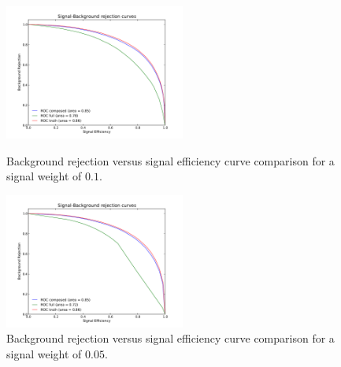 \documentclass[a4paper]{jpconf}
\begin{document}
\begin{figure}[h]
\hspace{3pc}
\begin{minipage}{14pc}
\includegraphics[width=14pc]{comp_all_mlp_sigbkg_01.pdf}
\caption{\label{fig:roc1} Background rejection versus signal efficiency curve comparison for a signal weight of $0.1$.} %
\end{minipage}\hspace{2pc}%
\begin{minipage}{14pc}
\includegraphics[width=14pc]{comp_all_mlp_sigbkg_005.pdf}
\caption{\label{fig:roc2} Background rejection versus signal efficiency curve comparison for a signal weight of $0.05$.}
\end{minipage}
\end{figure}
\end{document}
